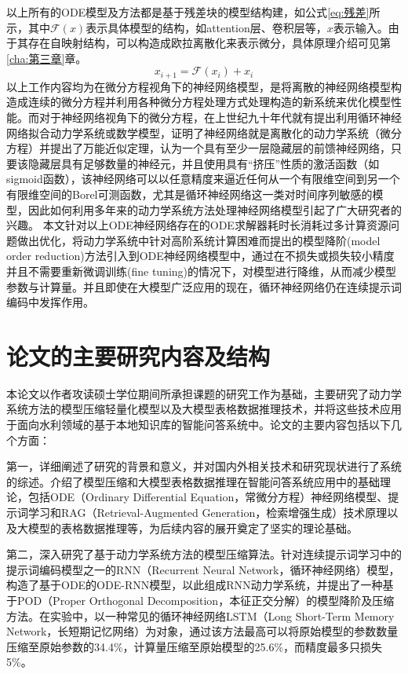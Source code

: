 以上所有的ODE模型及方法都是基于残差块\cite{weinan2017proposal}的模型结构建，如公式\ref{eq:残差}所示，其中\(\mathcal{F}(x)\)表示具体模型的结构，如attention层、卷积层等，$x$表示输入。由于其存在自映射结构，可以构造成欧拉离散化来表示微分，具体原理介绍可见第\ref{cha:第三章}章。
\begin{equation}
  \label{eq:残差}
  x_{i+1} = \mathcal{F}(x_i) + x_i
\end{equation}
以上工作内容均为在微分方程视角下的神经网络模型，是将离散的神经网络模型构造成连续的微分方程并利用各种微分方程处理方式处理构造的新系统来优化模型性能。而对于神经网络视角下的微分方程，在上世纪九十年代就有提出利用循环神经网络拟合动力学系统或数学模型\cite{cybenko1989approximation,li2022deep,cao2018brits,pearlmutter1989learning,neil2016phased,che2018recurrent}，证明了神经网络就是离散化的动力学系统（微分方程）并提出了万能近似定理，认为一个具有至少一层隐藏层的前馈神经网络，只要该隐藏层具有足够数量的神经元，并且使用具有“挤压”性质的激活函数（如sigmoid函数），该神经网络可以以任意精度来逼近任何从一个有限维空间到另一个有限维空间的Borel可测函数，尤其是循环神经网络这一类对时间序列敏感的模型，因此如何利用多年来的动力学系统方法处理神经网络模型引起了广大研究者的兴趣。
本文针对以上ODE神经网络存在的ODE求解器耗时长消耗过多计算资源问题做出优化，将动力学系统中针对高阶系统计算困难而提出的模型降阶(model order reduction)方法引入到ODE神经网络模型中，通过在不损失或损失较小精度并且不需要重新微调训练(fine tuning)的情况下，对模型进行降维，从而减少模型参数与计算量。并且即使在大模型广泛应用的现在，循环神经网络仍在连续提示词编码中发挥作用。


\section{论文的主要研究内容及结构}
本论文以作者攻读硕士学位期间所承担课题的研究工作为基础，主要研究了动力学系统方法的模型压缩轻量化模型以及大模型表格数据推理技术，并将这些技术应用于面向水利领域的基于本地知识库的智能问答系统中。论文的主要内容包括以下几个方面： 

第一，详细阐述了研究的背景和意义，并对国内外相关技术和研究现状进行了系统的综述。介绍了模型压缩和大模型表格数据推理在智能问答系统应用中的基础理论，包括ODE（Ordinary Differential Equation，常微分方程）神经网络模型、提示词学习和RAG（Retrieval-Augmented Generation，检索增强生成）技术原理以及大模型的表格数据推理等，为后续内容的展开奠定了坚实的理论基础。 

第二，深入研究了基于动力学系统方法的模型压缩算法。针对连续提示词学习中的提示词编码模型之一的RNN（Recurrent Neural Network，循环神经网络）模型，构造了基于ODE的ODE-RNN模型，以此组成RNN动力学系统，并提出了一种基于POD（Proper Orthogonal Decomposition，本征正交分解）的模型降阶及压缩方法。在实验中，以一种常见的循环神经网络LSTM（Long Short-Term Memory Network，长短期记忆网络）为对象，通过该方法最高可以将原始模型的参数数量压缩至原始参数的34.4\%，计算量压缩至原始模型的25.6\%，而精度最多只损失5\%。

